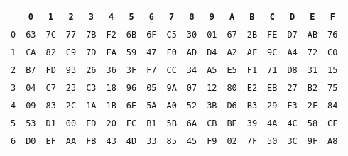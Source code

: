 \begin{tabular}{|c|c|c|c|c|c|c|c|c|c|c|c|c|c|c|c|c|}
\hline
\cellcolor{gray!30} & \cellcolor{gray!30}\texttt{0} & \cellcolor{gray!30}\texttt{1} & \cellcolor{gray!30}\texttt{2} & \cellcolor{gray!30}\texttt{3} & \cellcolor{gray!30}\texttt{4} & \cellcolor{gray!30}\texttt{5} & \cellcolor{gray!30}\texttt{6} & \cellcolor{gray!30}\texttt{7} & \cellcolor{gray!30}\texttt{8} & \cellcolor{gray!30}\texttt{9} & \cellcolor{gray!30}\texttt{A} & \cellcolor{gray!30}\texttt{B} & \cellcolor{gray!30}\texttt{C} & \cellcolor{gray!30}\texttt{D} & \cellcolor{gray!30}\texttt{E} & \cellcolor{gray!30}\texttt{F} \\ \hline
\cellcolor{gray!30}\texttt{0} & \texttt{63} & \texttt{7C} & \texttt{77} & \texttt{7B} & \texttt{F2} & \texttt{6B} & \texttt{6F} & \texttt{C5} & \texttt{30} & \texttt{01} & \texttt{67} & \texttt{2B} & \texttt{FE} & \texttt{D7} & \texttt{AB} & \texttt{76} \\ \hline
\cellcolor{gray!30}\texttt{1} & \texttt{CA} & \texttt{82} & \texttt{C9} & \texttt{7D} & \texttt{FA} & \texttt{59} & \texttt{47} & \texttt{F0} & \texttt{AD} & \texttt{D4} & \texttt{A2} & \texttt{AF} & \texttt{9C} & \texttt{A4} & \texttt{72} & \texttt{C0} \\ \hline
\cellcolor{gray!30}\texttt{2} & \texttt{B7} & \texttt{FD} & \texttt{93} & \texttt{26} & \texttt{36} & \texttt{3F} & \texttt{F7} & \texttt{CC} & \texttt{34} & \texttt{A5} & \texttt{E5} & \texttt{F1} & \texttt{71} & \texttt{D8} & \texttt{31} & \texttt{15} \\ \hline
\cellcolor{gray!30}\texttt{3} & \texttt{04} & \texttt{C7} & \texttt{23} & \texttt{C3} & \texttt{18} & \texttt{96} & \texttt{05} & \texttt{9A} & \texttt{07} & \texttt{12} & \texttt{80} & \texttt{E2} & \texttt{EB} & \texttt{27} & \texttt{B2} & \texttt{75} \\ \hline
\cellcolor{gray!30}\texttt{4} & \texttt{09} & \texttt{83} & \texttt{2C} & \texttt{1A} & \texttt{1B} & \texttt{6E} & \texttt{5A} & \texttt{A0} & \texttt{52} & \texttt{3B} & \texttt{D6} & \texttt{B3} & \texttt{29} & \texttt{E3} & \texttt{2F} & \texttt{84} \\ \hline
\cellcolor{gray!30}\texttt{5} & \texttt{53} & \texttt{D1} & \texttt{00} & \texttt{ED} & \texttt{20} & \texttt{FC} & \texttt{B1} & \texttt{5B} & \texttt{6A} & \texttt{CB} & \texttt{BE} & \texttt{39} & \texttt{4A} & \texttt{4C} & \texttt{58} & \texttt{CF} \\ \hline
\cellcolor{gray!30}\texttt{6} & \texttt{D0} & \texttt{EF} & \texttt{AA} & \texttt{FB} & \texttt{43} & \texttt{4D} & \texttt{33} & \texttt{85} & \texttt{45} & \texttt{F9} & \texttt{02} & \texttt{7F} & \texttt{50} & \texttt{3C} & \texttt{9F} & \texttt{A8} \\ \hline

\end{tabular}
